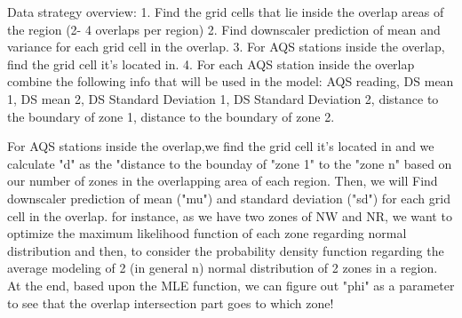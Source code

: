 Data strategy overview:
1.    Find the grid cells that lie inside the overlap areas of the region (2- 4 overlaps per region)
2.    Find downscaler prediction of mean and variance for each grid cell in the overlap.
3.    For AQS stations inside the overlap, find the grid cell it’s located in.
4.    For each AQS station inside the overlap combine the following info that will be used in the model: AQS reading, DS mean 1, DS mean 2, DS Standard Deviation 1, DS Standard Deviation 2, distance to the boundary of zone 1, distance to the boundary of zone 2.





For AQS stations inside the overlap,we find the grid cell it’s located in and we calculate "d" as the "distance to the bounday of "zone 1" to the "zone n" based on our number of zones in the overlapping area of each region. Then, we will Find downscaler prediction of mean ("mu") and standard deviation ("sd") for each grid cell in the overlap.
for instance, as we have two zones of NW and NR, we want to optimize the maximum likelihood function of each zone regarding normal distribution and then, to consider the probability density function regarding the average modeling of 2 (in general n) normal distribution of 2 zones in a region.
At the end, based upon the MLE function, we can figure out "phi" as a parameter to see that the overlap intersection part goes to which zone!






















   